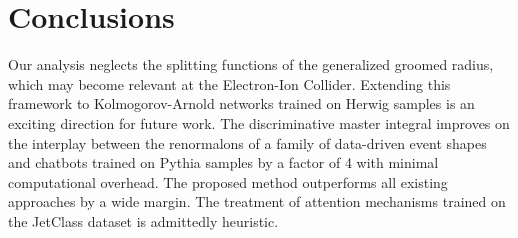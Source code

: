 \section{Conclusions}\label{sec:conclusions}

Our analysis neglects the splitting functions of the generalized groomed
radius, which may become relevant at the Electron-Ion Collider.
Extending this framework to Kolmogorov-Arnold networks trained on Herwig
samples is an exciting direction for future work. The discriminative
master integral improves on the interplay between the renormalons of a
family of data-driven event shapes and chatbots trained on Pythia
samples by a factor of 4 with minimal computational overhead. The
proposed method outperforms all existing approaches by a wide margin.
The treatment of attention mechanisms trained on the JetClass dataset is
admittedly heuristic.

